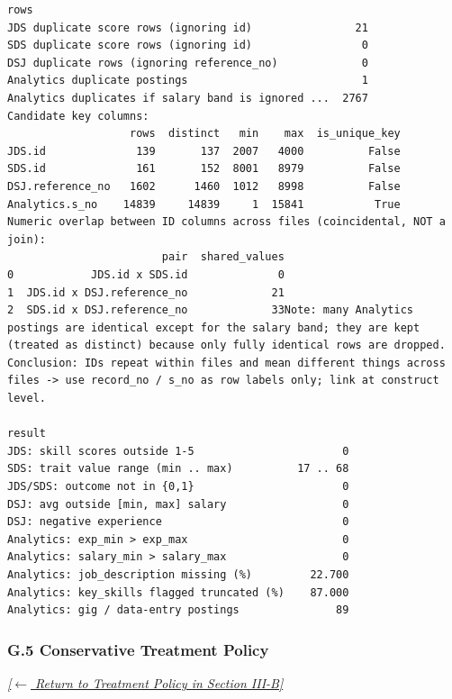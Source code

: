 \documentclass[conference]{IEEEtran}
\begin{document}
\begin{lstlisting}[style=outputstyle,caption={Execution Output G.4: Key Disconnect Proof and Domain Validation.},label={out:domain}]
rows
JDS duplicate score rows (ignoring id)                21
SDS duplicate score rows (ignoring id)                 0
DSJ duplicate rows (ignoring reference_no)             0
Analytics duplicate postings                           1
Analytics duplicates if salary band is ignored ...  2767
Candidate key columns:
                   rows  distinct   min    max  is_unique_key
JDS.id              139       137  2007   4000          False
SDS.id              161       152  8001   8979          False
DSJ.reference_no   1602      1460  1012   8998          False
Analytics.s_no    14839     14839     1  15841           True
Numeric overlap between ID columns across files (coincidental, NOT a join):
                        pair  shared_values
0            JDS.id x SDS.id              0
1  JDS.id x DSJ.reference_no             21
2  SDS.id x DSJ.reference_no             33Note: many Analytics postings are identical except for the salary band; they are kept (treated as distinct) because only fully identical rows are dropped.
Conclusion: IDs repeat within files and mean different things across files -> use record_no / s_no as row labels only; link at construct level.

result
JDS: skill scores outside 1-5                       0
SDS: trait value range (min .. max)          17 .. 68
JDS/SDS: outcome not in {0,1}                       0
DSJ: avg outside [min, max] salary                  0
DSJ: negative experience                            0
Analytics: exp_min > exp_max                        0
Analytics: salary_min > salary_max                  0
Analytics: job_description missing (%)         22.700
Analytics: key_skills flagged truncated (%)    87.000
Analytics: gig / data-entry postings               89
\end{lstlisting}

\subsubsection*{G.5 Conservative Treatment Policy}
\label{lst:treatment}
\textit{\hyperref[sec:treatment]{[$\leftarrow$ Return to Treatment Policy in Section III-B]}}
\end{document}
